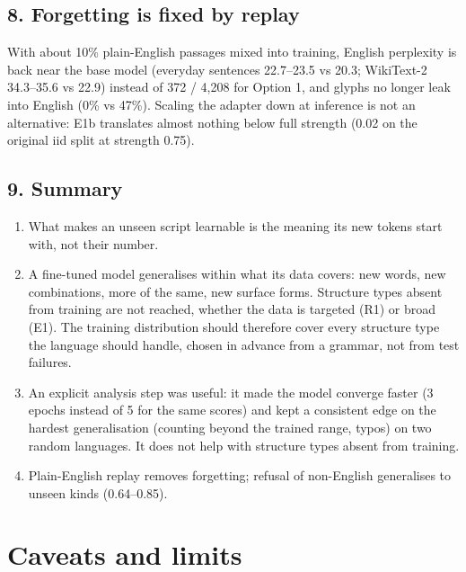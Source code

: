 \documentclass[10pt,a4paper,oneside]{article}
\begin{document}
\subsection*{8. Forgetting is fixed by replay}
With about 10\% plain-English passages mixed into training, English perplexity is back near the base model
(everyday sentences 22.7--23.5 vs 20.3; WikiText-2 34.3--35.6 vs 22.9) instead of 372 / 4,208 for Option 1, and glyphs no
longer leak into English (0\% vs 47\%). Scaling the adapter down at inference is not an alternative: E1b translates
almost nothing below full strength (0.02 on the original iid split at strength 0.75).

\subsection*{9. Summary}
\begin{enumerate}
\item What makes an unseen script learnable is the meaning its new tokens start with, not their number.
\item A fine-tuned model generalises within what its data covers: new words, new combinations, more of the same,
new surface forms. Structure types absent from training are not reached, whether the data is targeted (R1) or broad
(E1). The training distribution should therefore cover every structure type the language should handle, chosen in
advance from a grammar, not from test failures.
\item An explicit analysis step was useful: it made the model converge faster (3 epochs instead of 5 for the same
scores) and kept a consistent edge on the hardest generalisation (counting beyond the trained range, typos) on two
random languages. It does not help with structure types absent from training.
\item Plain-English replay removes forgetting; refusal of non-English generalises to unseen kinds (0.64--0.85).
\end{enumerate}

\section{Caveats and limits}
\end{document}
